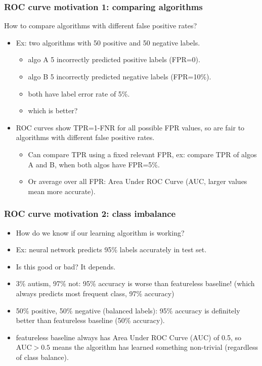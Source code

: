 \documentclass[t]{beamer}
\begin{document}
\begin{frame} \frametitle{ROC curve motivation 1: comparing algorithms}
  How to compare algorithms with different false positive rates?
  \begin{itemize}
   \item Ex: two algorithms with 50 positive and 50 negative labels.
   \begin{itemize}
    \item algo A 5 incorrectly predicted positive labels (FPR=0).
    \item algo B 5 incorrectly predicted negative labels (FPR=10\%).
    \item both have label error rate of 5\%.
    \item which is better?
   \end{itemize}
 \item ROC curves show TPR=1-FNR for all possible FPR values, so are fair to algorithms with different false positive rates.
   \begin{itemize}
   \item Can compare TPR using a fixed relevant FPR, ex: compare TPR of algos A and B, when both algos have FPR=5\%.
   \item Or average over all FPR: Area Under ROC Curve (AUC, larger values mean more accurate).
   \end{itemize}
  \end{itemize}
\end{frame}

\begin{frame} \frametitle{ROC curve motivation 2: class imbalance}
  \begin{itemize}
  \item How do we know if our learning algorithm is working?
  \item Ex: neural network predicts 95\% labels accurately in test set.
  \item Is this good or bad? It depends.
  \item 3\% autism, 97\% not: 95\% accuracy is worse than featureless
    baseline! (which always predicts most frequent class, 97\% accuracy)
  \item 50\% positive, 50\% negative (balanced labels): 95\% accuracy
    is definitely better than featureless baseline (50\% accuracy).
  \item featureless baseline always has
    Area Under ROC Curve (AUC) of 0.5, so AUC$>0.5$ means the algorithm has learned something non-trivial (regardless of class balance).
  \end{itemize}
\end{frame}
\end{document}
